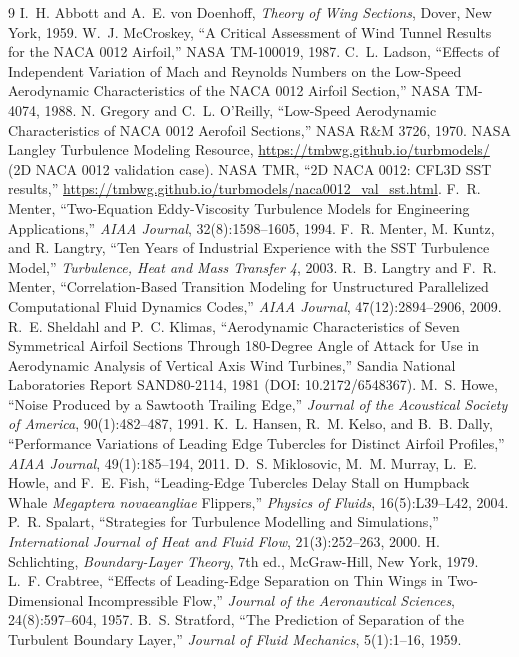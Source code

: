 \documentclass[11pt,a4paper]{article}
\begin{document}
\begin{thebibliography}{9}
 I.~H. Abbott and A.~E. von Doenhoff, \emph{Theory of Wing Sections}, Dover, New York, 1959.
 W.~J. McCroskey, ``A Critical Assessment of Wind Tunnel Results for the NACA 0012 Airfoil,'' NASA TM-100019, 1987.
 C.~L. Ladson, ``Effects of Independent Variation of Mach and Reynolds Numbers on the Low-Speed Aerodynamic Characteristics of the NACA 0012 Airfoil Section,'' NASA TM-4074, 1988.
 N. Gregory and C.~L. O'Reilly, ``Low-Speed Aerodynamic Characteristics of NACA 0012 Aerofoil Sections,'' NASA R\&M 3726, 1970.
 NASA Langley Turbulence Modeling Resource, \url{https://tmbwg.github.io/turbmodels/} (2D NACA 0012 validation case).
 NASA TMR, ``2D NACA 0012: CFL3D SST results,'' \url{https://tmbwg.github.io/turbmodels/naca0012_val_sst.html}.
 F.~R. Menter, ``Two-Equation Eddy-Viscosity Turbulence Models for Engineering Applications,'' \emph{AIAA Journal}, 32(8):1598--1605, 1994.
 F.~R. Menter, M. Kuntz, and R. Langtry, ``Ten Years of Industrial Experience with the SST Turbulence Model,'' \emph{Turbulence, Heat and Mass Transfer 4}, 2003.
 R.~B. Langtry and F.~R. Menter, ``Correlation-Based Transition Modeling for Unstructured Parallelized Computational Fluid Dynamics Codes,'' \emph{AIAA Journal}, 47(12):2894--2906, 2009.
 R.~E. Sheldahl and P.~C. Klimas, ``Aerodynamic Characteristics of Seven Symmetrical Airfoil Sections Through 180-Degree Angle of Attack for Use in Aerodynamic Analysis of Vertical Axis Wind Turbines,'' Sandia National Laboratories Report SAND80-2114, 1981 (DOI: 10.2172/6548367).
 M.~S. Howe, ``Noise Produced by a Sawtooth Trailing Edge,'' \emph{Journal of the Acoustical Society of America}, 90(1):482--487, 1991.
 K.~L. Hansen, R.~M. Kelso, and B.~B. Dally, ``Performance Variations of Leading Edge Tubercles for Distinct Airfoil Profiles,'' \emph{AIAA Journal}, 49(1):185--194, 2011.
 D.~S. Miklosovic, M.~M. Murray, L.~E. Howle, and F.~E. Fish, ``Leading-Edge Tubercles Delay Stall on Humpback Whale \emph{Megaptera novaeangliae} Flippers,'' \emph{Physics of Fluids}, 16(5):L39--L42, 2004.
 P.~R. Spalart, ``Strategies for Turbulence Modelling and Simulations,'' \emph{International Journal of Heat and Fluid Flow}, 21(3):252--263, 2000.
 H. Schlichting, \emph{Boundary-Layer Theory}, 7th ed., McGraw-Hill, New York, 1979.
 L.~F. Crabtree, ``Effects of Leading-Edge Separation on Thin Wings in Two-Dimensional Incompressible Flow,'' \emph{Journal of the Aeronautical Sciences}, 24(8):597--604, 1957.
 B.~S. Stratford, ``The Prediction of Separation of the Turbulent Boundary Layer,'' \emph{Journal of Fluid Mechanics}, 5(1):1--16, 1959.
\end{thebibliography}
\end{document}
